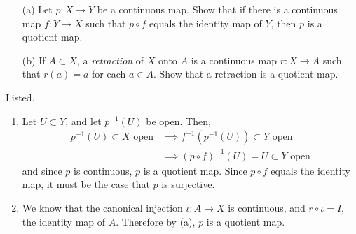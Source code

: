   \begin{exercise}[Munkres 22.2]
    \begin{enumerate}
      \item[(a)] Let $p : X \to Y$ be a continuous map. Show that if there is a continuous map
        $f : Y \to X$ such that $p \circ f$ equals the identity map of $Y$, then $p$ is a quotient
        map.
      
      \item[(b)] If $A \subset X$, a \textit{retraction} of $X$ onto $A$ is a continuous map $r : X \to A$ such
        that $r(a) = a$ for each $a \in A$. Show that a retraction is a quotient map.
    \end{enumerate}
  \end{exercise}
  \begin{solution}
     Listed. 
     \begin{enumerate}
       \item Let $U \subset Y$, and let $p^{-1}(U)$ be open. Then, 
       \begin{align}
         p^{-1} (U) \subset X \text{ open} & \implies f^{-1} (p^{-1}(U)) \subset Y \text{ open} \\
                                           & \implies (p \circ f)^{-1} (U) = U \subset Y \text{ open}
       \end{align}
       and since $p$ is continuous, $p$ is a quotient map. Since $p \circ f$ equals the identity map, it must be the case that $p$ is surjective. 

       \item We know that the canonical injection $\iota: A \rightarrow X$ is continuous, and $r \circ \iota = I$, the identity map of $A$. Therefore by (a), $p$ is a quotient map. 
     \end{enumerate}
  \end{solution}

